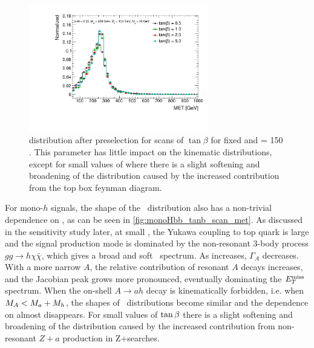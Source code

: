 \begin{figure}
\centering
\includegraphics[width=0.7\textwidth]{texinputs/04_grid/figures/monoz/leptonic/TanbScan_mA600_ma150_MET.pdf} 
\caption{\MET distribution after preselection for scans of $\tan{\beta}$ for fixed  \GeV and \ma = 150 \GeV. 
This parameter has little impact on the kinematic distributions, except for small values of \tanb where there is a slight softening and broadening of the \MET distribution caused by the increased contribution from the top box feynman diagram.}
\label{fig:monoz_kin_tanb}
\end{figure}

For mono-$h$ signals, the shape of the \MET\ distribution also has a non-trivial dependence on \tanb, as can be seen in \autoref{fig:monoHbb_tanb_scan_met}.
As discussed in the sensitivity study later, at small \tanb, the Yukawa coupling to top quark is large and the signal production mode is dominated by the non-resonant 3-body process $gg\rightarrow h\chi\bar{\chi}$, which gives a broad and soft \MET\ spectrum. 
As \tanb increases, $\Gamma_A$ decreases.  With a more narrow $A$, the relative contribution of resonant $A$ decays increases, and the Jacobian peak grows more pronounced, 
eventually dominating the $E_T^\mathrm{miss}$ spectrum.
When the on-shell $A \to a h$ decay is kinematically forbidden, i.e. when $M_{A}<M_{a}+M_{h}$, the shapes of \MET\ distributions become similar and the dependence on \tanb  almost disappears.
For small values of $\tan\beta$ there is a slight softening and broadening of the \MET distribution caused by the increased contribution from non-resonant $Z+a$ production in Z+\MET searches. 

